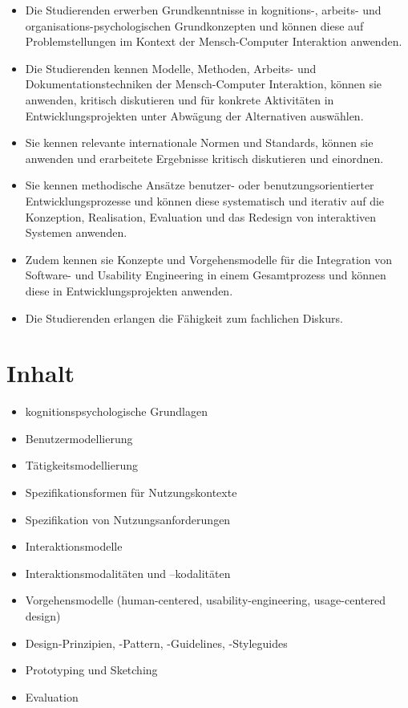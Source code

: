 \begin{itemize}
\tightlist
\item
  Die Studierenden erwerben Grundkenntnisse in kognitions-, arbeits- und
  organisations-psychologischen Grundkonzepten und können diese auf
  Problemstellungen im Kontext der Mensch-Computer Interaktion anwenden.
\item
  Die Studierenden kennen Modelle, Methoden, Arbeits- und
  Dokumentationstechniken der Mensch-Computer Interaktion, können sie
  anwenden, kritisch diskutieren und für konkrete Aktivitäten in
  Entwicklungsprojekten unter Abwägung der Alternativen auswählen.
\item
  Sie kennen relevante internationale Normen und Standards, können sie
  anwenden und erarbeitete Ergebnisse kritisch diskutieren und
  einordnen.
\item
  Sie kennen methodische Ansätze benutzer- oder benutzungsorientierter
  Entwicklungsprozesse und können diese systematisch und iterativ auf
  die Konzeption, Realisation, Evaluation und das Redesign von
  interaktiven Systemen anwenden.
\item
  Zudem kennen sie Konzepte und Vorgehensmodelle für die Integration von
  Software- und Usability Engineering in einem Gesamtprozess und können
  diese in Entwicklungsprojekten anwenden.
\item
  Die Studierenden erlangen die Fähigkeit zum fachlichen Diskurs.
\end{itemize}

\hypertarget{inhaltpathlabelmi-2017modulbeschreibungen-bachelorba_mensch-computer_interaktion}{%
\section*{Inhalt\label{/mi-2017/modulbeschreibungen-bachelor/BA_Mensch-Computer_Interaktion}}\label{inhaltpathlabelmi-2017modulbeschreibungen-bachelorba_mensch-computer_interaktion}}

\begin{itemize}
\tightlist
\item
  kognitionspsychologische Grundlagen
\item
  Benutzermodellierung
\item
  Tätigkeitsmodellierung
\item
  Spezifikationsformen für Nutzungskontexte
\item
  Spezifikation von Nutzungsanforderungen
\item
  Interaktionsmodelle
\item
  Interaktionsmodalitäten und --kodalitäten
\item
  Vorgehensmodelle (human-centered, usability-engineering,
  usage-centered design)
\item
  Design-Prinzipien, -Pattern, -Guidelines, -Styleguides
\item
  Prototyping und Sketching
\item
  Evaluation
\end{itemize}

